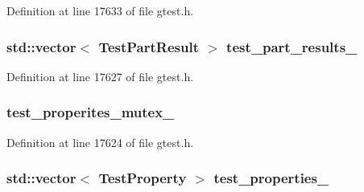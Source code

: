 \-Definition at line 17633 of file gtest.\-h.

\hypertarget{classtesting_1_1TestResult_ac2f4a65d121ee86aa2e19daed6269c2d}{
\subsubsection[{test\-\_\-part\-\_\-results\-\_\-}]{\setlength{\rightskip}{0pt plus 5cm}std\-::vector$<$ {\bf \-Test\-Part\-Result} $>$ {\bf test\-\_\-part\-\_\-results\-\_\-}}}\label{d6/d6e/classtesting_1_1TestResult_ac2f4a65d121ee86aa2e19daed6269c2d}


\-Definition at line 17627 of file gtest.\-h.

\hypertarget{classtesting_1_1TestResult_ae28fd07e38c889d9a31c99a2c9bfccc2}{
\subsubsection[{test\-\_\-properites\-\_\-mutex\-\_\-}]{ {\bf test\-\_\-properites\-\_\-mutex\-\_\-}}}\label{d6/d6e/classtesting_1_1TestResult_ae28fd07e38c889d9a31c99a2c9bfccc2}


\-Definition at line 17624 of file gtest.\-h.

\hypertarget{classtesting_1_1TestResult_aa0515640923d388f1495ae2622cb76f9}{
\subsubsection[{test\-\_\-properties\-\_\-}]{\setlength{\rightskip}{0pt plus 5cm}std\-::vector$<$ {\bf \-Test\-Property} $>$ {\bf test\-\_\-properties\-\_\-}}}\label{d6/d6e/classtesting_1_1TestResult_aa0515640923d388f1495ae2622cb76f9}


